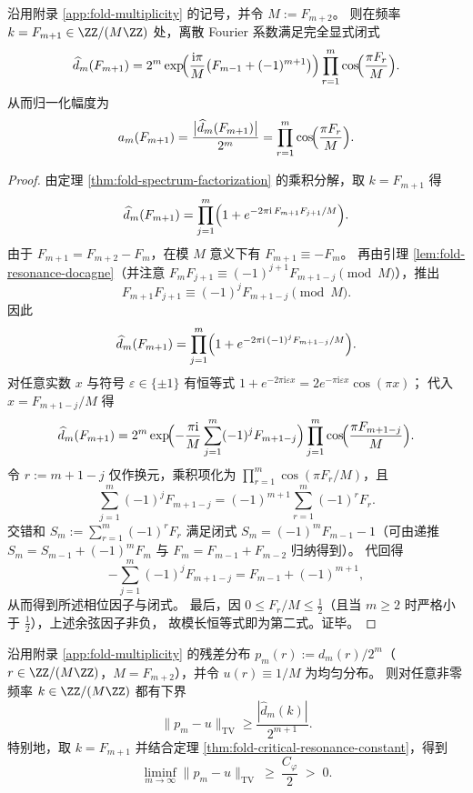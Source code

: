 \begin{theorem}\label{thm:fold-fibonacci-frequency-fourier-spike-closed-form}
沿用附录 \ref{app:fold-multiplicity} 的记号，并令 \(M:=F_{m+2}\)。
则在频率 \(k=F_{m+1}\in \ZZ/(M\ZZ)\) 处，离散 Fourier 系数满足完全显式闭式
\[
\widehat d_m(F_{m+1})
=
2^m\exp\!\Bigl(\frac{\mathrm{i}\pi}{M}\bigl(F_{m-1}+(-1)^{m+1}\bigr)\Bigr)
\prod_{r=1}^{m}\cos\!\Bigl(\frac{\pi F_r}{M}\Bigr).
\]
从而归一化幅度为
\[
a_m(F_{m+1})
=\frac{\bigl|\widehat d_m(F_{m+1})\bigr|}{2^m}
=\prod_{r=1}^{m}\cos\!\Bigl(\frac{\pi F_r}{M}\Bigr).
\]
\end{theorem}

\begin{proof}
由定理 \ref{thm:fold-spectrum-factorization} 的乘积分解，取 \(k=F_{m+1}\) 得
\[
\widehat d_m(F_{m+1})
=\prod_{j=1}^{m}\Bigl(1+e^{-2\pi \mathrm{i}\,F_{m+1}F_{j+1}/M}\Bigr).
\]
由于 \(F_{m+1}=F_{m+2}-F_m\)，在模 \(M\) 意义下有 \(F_{m+1}\equiv -F_m\)。
再由引理 \ref{lem:fold-resonance-docagne}（并注意 \(F_mF_{j+1}\equiv (-1)^{j+1}F_{m+1-j}\pmod M\)），推出
\[
F_{m+1}F_{j+1}\equiv (-1)^{j}F_{m+1-j}\pmod M.
\]
因此
\[
\widehat d_m(F_{m+1})
=\prod_{j=1}^{m}\Bigl(1+e^{-2\pi \mathrm{i}\,(-1)^{j}F_{m+1-j}/M}\Bigr).
\]
对任意实数 \(x\) 与符号 \(\varepsilon\in\{\pm1\}\) 有恒等式
\(
1+e^{-2\pi \mathrm{i}\varepsilon x}=2e^{-\pi \mathrm{i}\varepsilon x}\cos(\pi x)
\)；
代入 \(x=F_{m+1-j}/M\) 得
\[
\widehat d_m(F_{m+1})
=2^m\exp\!\Bigl(-\frac{\pi\mathrm{i}}{M}\sum_{j=1}^{m}(-1)^{j}F_{m+1-j}\Bigr)
\prod_{j=1}^{m}\cos\!\Bigl(\frac{\pi F_{m+1-j}}{M}\Bigr).
\]
令 \(r:=m+1-j\) 仅作换元，乘积项化为 \(\prod_{r=1}^{m}\cos(\pi F_{r}/M)\)，且
\[
\sum_{j=1}^{m}(-1)^{j}F_{m+1-j}
=(-1)^{m+1}\sum_{r=1}^{m}(-1)^{r}F_{r}.
\]
交错和 \(S_m:=\sum_{r=1}^{m}(-1)^{r}F_r\) 满足闭式 \(S_m=(-1)^mF_{m-1}-1\)（可由递推 \(S_m=S_{m-1}+(-1)^mF_m\) 与 \(F_m=F_{m-1}+F_{m-2}\) 归纳得到）。
代回得
\[
-\sum_{j=1}^{m}(-1)^{j}F_{m+1-j}
=F_{m-1}+(-1)^{m+1},
\]
从而得到所述相位因子与闭式。
最后，因 \(0\le F_r/M\le \tfrac12\)（且当 \(m\ge 2\) 时严格小于 \(\tfrac12\)），上述余弦因子非负，
故模长恒等式即为第二式。证毕。
\end{proof}

\begin{corollary}\label{cor:fold-tv-lower-bound-from-fourier-spike}
沿用附录 \ref{app:fold-multiplicity} 的残差分布 \(p_m(r):=d_m(r)/2^m\)（\(r\in\ZZ/(M\ZZ)\)，\(M=F_{m+2}\)），并令 \(u(r)\equiv 1/M\) 为均匀分布。
则对任意非零频率 \(k\in\ZZ/(M\ZZ)\) 都有下界
\[
\|p_m-u\|_{\mathrm{TV}}
\ge
\frac{|\widehat d_m(k)|}{2^{m+1}}.
\]
特别地，取 \(k=F_{m+1}\) 并结合定理 \ref{thm:fold-critical-resonance-constant}，得到
\[
\liminf_{m\to\infty}\|p_m-u\|_{\mathrm{TV}}\ \ge\ \frac{C_\varphi}{2}\;>\;0.
\]
\end{corollary}

